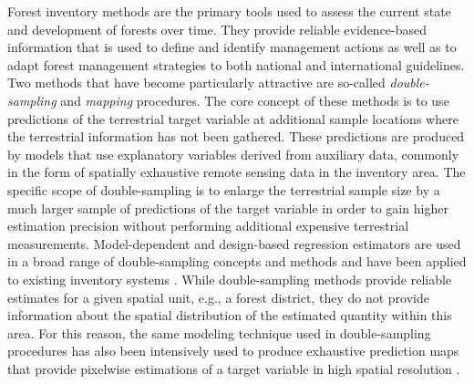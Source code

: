 Forest inventory methods are the primary tools used to assess the current state and development of forests over time. They provide reliable evidence-based information that is used to define and identify management actions as well as to adapt forest management strategies to both national and international guidelines. Two methods that have become particularly attractive are so-called \textit{double-sampling} \citep[]{mandallaz2008} and \textit{mapping}  procedures. The core concept of these methods is to use predictions of the terrestrial target variable at additional sample locations where the terrestrial information has not been gathered. These predictions are produced by models that use explanatory variables derived from auxiliary data, commonly in the form of spatially exhaustive remote sensing data in the inventory area.  The specific scope of double-sampling is to enlarge the terrestrial sample size by a much larger sample of predictions of the target variable in order to gain higher estimation precision without performing additional expensive terrestrial measurements. Model-dependent and design-based regression estimators are used in a broad range of double-sampling concepts and methods \citep{gregoire2007, kohl2006, schreuder1993, saborowski2010, mandallaz2013a, mandallaz2013c} and have been applied to existing inventory systems \citep{breidenbach2012, vonLuebke2014, mandallaz2013b, magnussen2014, massey2014a}. While double-sampling methods provide reliable estimates for a given spatial unit, e.g., a forest district, they do not provide information about the spatial distribution of the estimated quantity within this area. For this reason, the same modeling technique used in double-sampling procedures has also been intensively used to produce exhaustive prediction maps that provide pixelwise estimations of a target variable in high spatial resolution \citep{bohlin2017, latifi2010, tonolli2011, hill2014, nink2015}.\par

